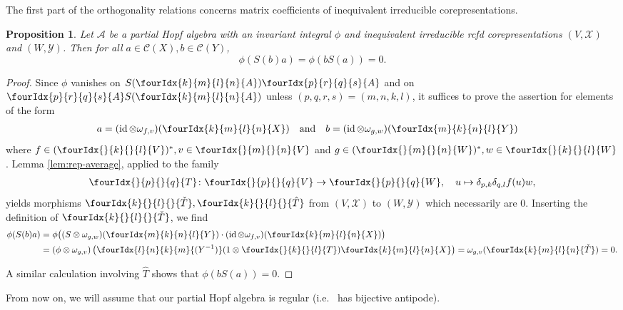 \documentclass[11pt]{article}
\DeclareMathOperator{\id}{id}
\newcommand{\dual}[1]{#1^{*}}
\newcommand{\Gr}[5]{\fourIdx{#2}{#4}{#3}{#5}{#1}}%
\newcommand{\Gru}[3]{\Gr{#1}{}{}{#2}{#3}}
\newcommand{\Grd}[3]{\Gr{#1}{#2}{#3}{}{}}
\newtheorem{Prop}[Theorem]{Proposition}
\theoremstyle{definition}
\numberwithin{equation}{section}
\begin{document}
The first part of the orthogonality relations concerns matrix
coefficients of inequivalent irreducible corepresentations. 
\begin{Prop} \label{prop:rep-orthogonality-1} Let $\mathcal{A}$ be a
  partial Hopf algebra with an invariant integral $\phi$ and inequivalent
  irreducible rcfd corepresentations $(V,\mathscr{X})$ and
  $(W,\mathscr{Y})$.  Then  for all
  $a\in \mathcal{C}(X), b \in \mathcal{C}(Y)$,
  \[\phi(S(b)a) = \phi(bS(a))=0.\]
\end{Prop}
\begin{proof}
Since $\phi$ vanishes on $S(\Gr{A}{k}{l}{m}{n})\Gr{A}{p}{q}{r}{s}$ and
on $\Gr{A}{p}{q}{r}{s}S(\Gr{A}{k}{l}{m}{n})$ unless
$(p,q,r,s) = (m,n,k,l)$, it suffices to prove the assertion for  elements of the form
\begin{align*}
  a&=(\id \otimes \omega_{f,v})(\Gr{X}{k}{l}{m}{n})  && \text{and} &
  b&=(\id \otimes \omega_{g,w})(\Gr{Y}{m}{n}{k}{l})
\end{align*}
where $f\in \dual{(\Gru{V}{k}{l})}, v \in \Gru{V}{m}{n}$ and $g \in
\dual{(\Gru{W}{m}{n})}, w \in \Gru{W}{k}{l}$.  Lemma
\ref{lem:rep-average}, applied to the family
  \begin{align*}
    \Gru{T}{p}{q} \colon \Gru{V}{p}{q} \to \Gru{W}{p}{q}, \quad u
    \mapsto  \delta_{p,k}\delta_{q,l}  f(u)w,
  \end{align*}
  yields morphisms $\Grd{\check{T}}{k}{l},\Grd{\hat{T}}{k}{l}$ from $(V,\mathscr{X})$ to
  $(W,\mathscr{Y})$ which necessarily are $0$. Inserting the
  definition of $\Grd{\check{T}}{k}{l}$, we find
  \begin{align*}
    \phi(S(b)a) &= \phi\big((S \otimes
    \omega_{g,w})(\Gr{Y}{m}{n}{k}{l}) \cdot (\id \otimes
    \omega_{f,v})(\Gr{X}{k}{l}{m}{n})\big) \\ &= (\phi \otimes \omega_{g,v})\left(\Gr{(Y^{-1})}{l}{k}{n}{m}(1 \otimes
      \Gru{T}{k}{l} )     \Gr{X}{k}{l}{m}{n}\right) 
    = \omega_{g,v}( \Gr{\check{T}}{k}{l}{m}{n}) = 0.
  \end{align*}
  
  A similar calculation involving $\hat{T}$ shows that
  $\phi(bS(a))=0$.  
\end{proof}

From now on, we will assume that our partial Hopf algebra is regular (i.e.~ has bijective antipode).
\end{document}
